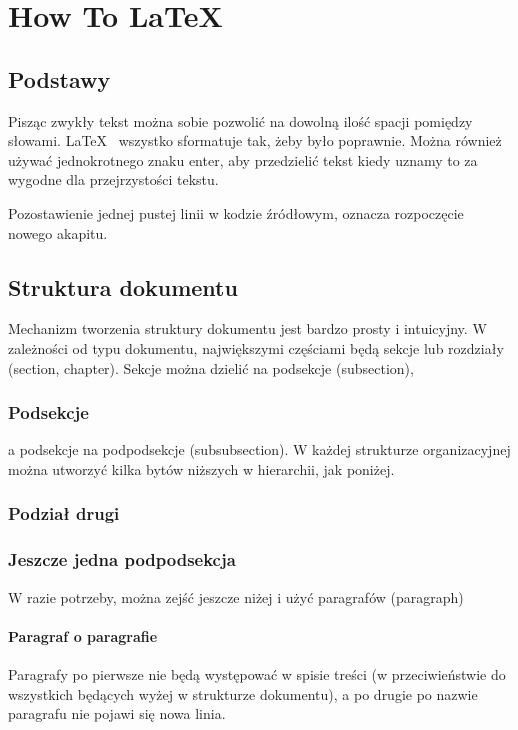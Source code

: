 \documentclass[12pt,a4paper]{article}
\begin{document}
\section{How To \LaTeX}

\subsection{Podstawy}

Pisząc zwykły tekst można sobie pozwolić na dowolną       ilość     spacji 
pomiędzy         słowami.          \LaTeX~                wszystko           sformatuje 
                                        tak,                     żeby było poprawnie.
Można również używać jednokrotnego znaku enter, aby przedzielić tekst
kiedy
uznamy 
to
za
wygodne
dla
przejrzystości
tekstu.

Pozostawienie jednej pustej linii w kodzie źródłowym, oznacza rozpoczęcie nowego akapitu.

\subsection{Struktura dokumentu}

Mechanizm tworzenia struktury dokumentu jest bardzo prosty i intuicyjny.
W zależności od typu dokumentu, największymi częściami będą sekcje lub rozdziały (section, chapter).
Sekcje można dzielić na podsekcje (subsection),
\subsubsection{Podsekcje}
a podsekcje na podpodsekcje (subsubsection).
W każdej strukturze organizacyjnej można utworzyć kilka bytów niższych w hierarchii, jak poniżej.
\subsubsection{Podział drugi}
\subsubsection{Jeszcze jedna podpodsekcja}

W razie potrzeby, można zejść jeszcze niżej i użyć paragrafów (paragraph)
\paragraph{Paragraf o paragrafie}
Paragrafy po pierwsze nie będą występować w spisie treści (w przeciwieństwie do wszystkich będących wyżej w strukturze dokumentu), a po drugie po nazwie paragrafu nie pojawi się nowa linia.
\end{document}
